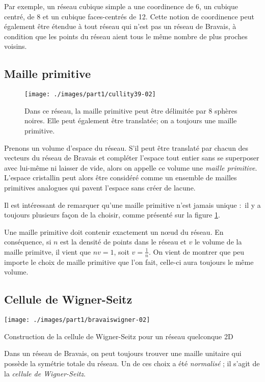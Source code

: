 Par exemple, un réseau cubique simple a une coordinence de 6, un cubique centré, de 8 et un cubique faces-centrés de 12. Cette notion de coordinence peut également être étendue à tout réseau qui n'est pas un réseau de Bravais, à condition que les points du réseau aient tous le même nombre de plus proches voisins.

\subsection{Maille primitive}

\begin{figure}
    \texttt{[image: ./images/part1/cullity39-02]}
    \caption{Dans ce réseau, la maille primitive peut être délimitée par 8
    sphères noires. Elle peut également être translatée; on a toujours une maille
    primitive.}
    \label{fig:choixmaillespriv}
\end{figure}

Prenons un volume d'espace du réseau. S'il peut être translaté par chacun des vecteurs du réseau de Bravais et compléter l'espace tout entier sans se superposer avec lui-même ni laisser de vide, alors on appelle ce volume une \emph{maille primitive}.
L'espace cristallin peut alors être considéré comme un ensemble de mailles primitives analogues qui pavent l'espace sans créer de lacune.

Il est intéressant de remarquer qu'une maille primitive n'est jamais unique : il y a toujours plusieurs façon de la choisir, comme présenté sur la figure \ref{fig:choixmaillespriv}.

Une maille primitive doit contenir exactement un nœud du réseau. En conséquence, si $n$ est la densité de points dans le réseau et $v$ le volume de la maille primitve, il vient que $nv = 1$, soit $v = \frac{1}{n}$. On vient de montrer que peu importe le choix de maille primitive que l'on fait, celle-ci aura toujours le même volume.


\subsection{Cellule de Wigner-Seitz}

\begin{marginfigure}
    \texttt{[image: ./images/part1/bravaiswigner-02]}
    \caption{Construction de la cellule de Wigner-Seitz pour un réseau quelconque 2D}
    \label{fig:ws2d}
\end{marginfigure}

Dans un réseau de Bravais, on peut toujours trouver une maille unitaire qui possède la symétrie totale du réseau. Un de ces choix a été \emph{normalisé} ; il s'agit de la \emph{cellule de Wigner-Seitz}.

